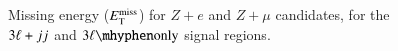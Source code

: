 \begin{figure}[htb]
{  }
  \caption{Missing energy ($E_{\text{T}}^{\text{miss}}$) for $Z+e$ and $Z+\mu$ candidates, for the $3\ell+jj$ and $\threelo$ signal regions.}
  \label{fig:SR-ETMiss-2}
\end{figure}

\clearpage
